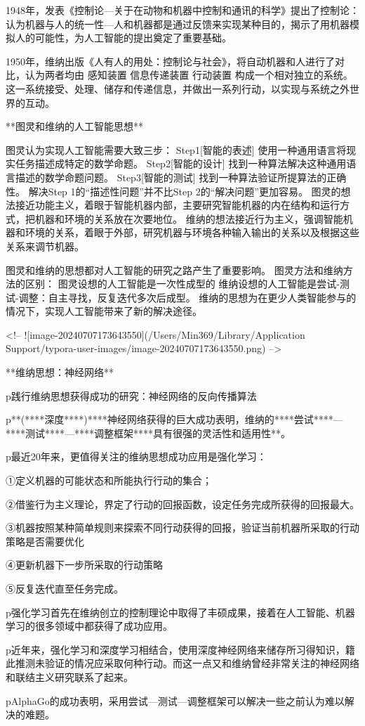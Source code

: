 1948年，发表《控制论---关于在动物和机器中控制和通讯的科学》提出了控制论：
认为机器与人的统一性—人和机器都是通过反馈来实现某种目的，揭示了用机器模拟人的可能性，为人工智能的提出奠定了重要基础。



1950年，维纳出版《人有人的用处：控制论与社会》，将自动机器和人进行了对比，认为两者均由
	感知装置	
	信息传递装置
	行动装置
  构成一个相对独立的系统。
这一系统接受、处理、储存和传递信息，并做出一系列行动，以实现与系统之外世界的互动。



**图灵和维纳的人工智能思想**

图灵认为实现人工智能需要大致三步：
Step1[智能的表述] 使用一种通用语言将现实任务描述成特定的数学命题。
Step2[智能的设计] 找到一种算法解决这种通用语言描述的数学命题问题。
Step3[智能的测试] 找到一种算法验证所提算法的正确性。
解决Step 1的“描述性问题”并不比Step 2的“解决问题”更加容易。
图灵的想法接近功能主义，着眼于智能机器内部，主要研究智能机器的内在结构和运行方式，把机器和环境的关系放在次要地位。
维纳的想法接近行为主义，强调智能机器和环境的关系，着眼于外部，研究机器与环境各种输入输出的关系以及根据这些关系来调节机器。



图灵和维纳的思想都对人工智能的研究之路产生了重要影响。
图灵方法和维纳方法的区别：
图灵设想的人工智能是一次性成型的
维纳设想的人工智能是尝试-测试-调整：自主寻找，反复迭代多次后成型。
维纳的思想为在更少人类智能参与的情况下，实现人工智能带来了新的解决途径。

<!-- ![image-20240707173643550](/Users/Min369/Library/Application Support/typora-user-images/image-20240707173643550.png) -->



**维纳思想：神经网络**

p践行维纳思想获得成功的研究：神经网络的反向传播算法

p**(****深度****)****神经网络获得的巨大成功表明，维纳的****尝试****—****测试****—****调整框架****具有很强的灵活性和适用性**。

p最近20年来，更值得关注的维纳思想成功应用是强化学习：

①定义机器的可能状态和所能执行行动的集合；

②借鉴行为主义理论，界定了行动的回报函数，设定任务完成所获得的回报最大。

③机器按照某种简单规则来探索不同行动获得的回报，验证当前机器所采取的行动策略是否需要优化

④更新机器下一步所采取的行动策略

⑤反复迭代直至任务完成。



p强化学习首先在维纳创立的控制理论中取得了丰硕成果，接着在人工智能、机器学习的很多领域中都获得了成功应用。

p近年来，强化学习和深度学习相结合，使用深度神经网络来储存所习得知识，籍此推测未验证的情况应采取何种行动。而这一点又和维纳曾经非常关注的神经网络和联结主义研究联系了起来。

pAlphaGo的成功表明，采用尝试—测试—调整框架可以解决一些之前认为难以解决的难题。
